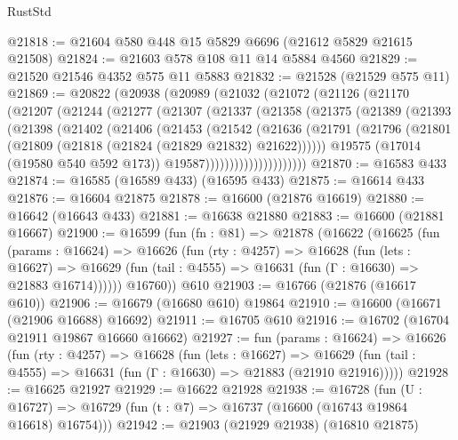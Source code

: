 \begin{lexlean}{RustStd}
\begin{coremodule}
{\begin{coremodule}
{{{{{{{{{{{{{{{{{{{{{{{{{{{{{{{{{{{{{{{{{{{{{{{{{{{{{{{@21818 := @21604 @580 @448 @15 @5829 @6696 (@21612 @5829 @21615 @21508)
@21824 := @21603 @578 @108 @11 @14 @5884 @4560
@21829 := @21520 @21546 @4352 @575 @11 @5883
@21832 := @21528 (@21529 @575 @11)
@21869 := @20822
    (@20938
      (@20989
        (@21032
          (@21072
            (@21126
              (@21170
                (@21207
                  (@21244
                    (@21277
                      (@21307
                        (@21337
                          (@21358
                            (@21375
                              (@21389
                                (@21393
                                  (@21398
                                    (@21402
                                      (@21406
                                        (@21453
                                          (@21542
                                            (@21636
                                              (@21791
                                                (@21796
                                                  (@21801
                                                    (@21809
                                                      (@21818 (@21824 (@21829 @21832) @21622))))))
                                              @19575
                                              (@17014 (@19580 @540 @592 @173))
                                              @19587)))))))))))))))))))))
@21870 := @16583 @433
@21874 := @16585 (@16589 @433) (@16595 @433)
@21875 := @16614 @433
@21876 := @16604 @21875
@21878 := @16600 (@21876 @16619)
@21880 := @16642 (@16643 @433)
@21881 := @16638 @21880
@21883 := @16600 (@21881 @16667)
@21900 := @16599
    (fun (fn : @81) =>
    @21878
      (@16622
        (@16625
          (fun (params : @16624) =>
          @16626
            (fun (rty : @4257) =>
            @16628
              (fun (lets : @16627) =>
              @16629 (fun (tail : @4555) => @16631 (fun (Γ : @16630) => @21883 @16714))))))
        @16760))
    @610
@21903 := @16766 (@21876 (@16617 @610))
@21906 := @16679 (@16680 @610) @19864
@21910 := @16600 (@16671 (@21906 @16688) @16692)
@21911 := @16705 @610
@21916 := @16702 (@16704 @21911 @19867 @16660 @16662)
@21927 := fun (params : @16624) =>
  @16626
    (fun (rty : @4257) =>
    @16628
      (fun (lets : @16627) =>
      @16629 (fun (tail : @4555) => @16631 (fun (Γ : @16630) => @21883 (@21910 @21916)))))
@21928 := @16625 @21927
@21929 := @16622 @21928
@21938 := @16728
    (fun (U : @16727) => @16729 (fun (t : @7) => @16737 (@16600 (@16743 @19864 @16618) @16754)))
@21942 := @21903 (@21929 @21938) (@16810 @21875)
}}}}}}}}}}}}}}}}}}}}}}}}}}}}}}}}}}}}}}}}}}}}}}}}}}}}}}}
\end{coremodule}}
\end{coremodule}
\end{lexlean}
